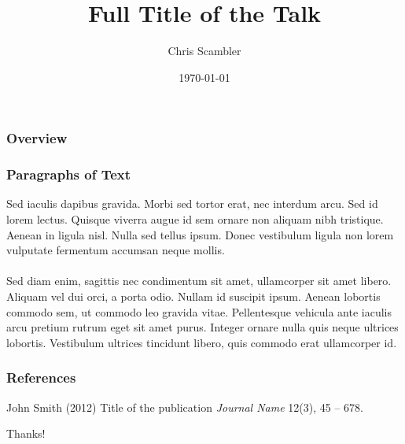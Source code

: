 \documentclass{beamer}
\title[Short title]{Full Title of the Talk}
\author{Chris Scambler}
\institute[ASC] 
{
All Souls College, \\
Oxford University \\ 
\medskip
\textit{cscambler@gmail.com} 
}
\date{\today}
\begin{document}
\begin{frame}
\titlepage 
\end{frame}

\begin{frame}
\frametitle{Overview} 
\tableofcontents 
\end{frame}

\begin{frame}
\frametitle{Paragraphs of Text}
Sed iaculis dapibus gravida. Morbi sed tortor erat, nec interdum arcu. Sed id lorem lectus. Quisque viverra augue id sem ornare non aliquam nibh tristique. Aenean in ligula nisl. Nulla sed tellus ipsum. Donec vestibulum ligula non lorem vulputate fermentum accumsan neque mollis.\\~\\

Sed diam enim, sagittis nec condimentum sit amet, ullamcorper sit amet libero. Aliquam vel dui orci, a porta odio. Nullam id suscipit ipsum. Aenean lobortis commodo sem, ut commodo leo gravida vitae. Pellentesque vehicula ante iaculis arcu pretium rutrum eget sit amet purus. Integer ornare nulla quis neque ultrices lobortis. Vestibulum ultrices tincidunt libero, quis commodo erat ullamcorper id.
\end{frame}


\begin{frame}
\frametitle{References}
\footnotesize{
\begin{thebibliography}{99}
     John Smith (2012)
    \newblock Title of the publication
    \newblock \emph{Journal Name} 12(3), 45 -- 678.
    \end{thebibliography}
}
\end{frame}

\begin{frame}
\Huge{\centerline{Thanks!}}
\end{frame}
\end{document}
